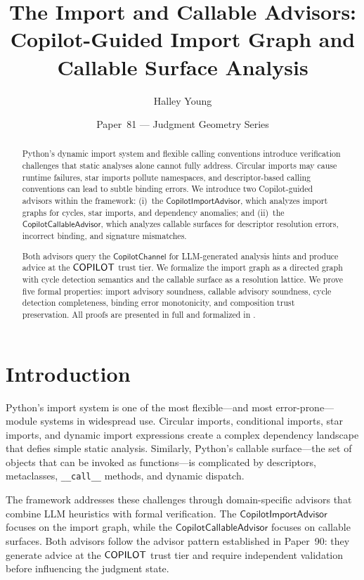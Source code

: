 \documentclass[11pt]{article}
\title{\textbf{The Import and Callable Advisors:\\
Copilot-Guided Import Graph and Callable Surface Analysis}}
\author{Halley Young}
\date{Paper~81 --- Judgment Geometry Series}
\newcommand{\ImportAdv}{\mathsf{CopilotImportAdvisor}}
\newcommand{\CallAdv}{\mathsf{CopilotCallableAdvisor}}
\newcommand{\CopChan}{\mathsf{CopilotChannel}}
\begin{document}
\maketitle

\begin{abstract}
Python's dynamic import system and flexible calling conventions
introduce verification challenges that static analyses alone
cannot fully address.  Circular imports may cause runtime failures,
star imports pollute namespaces, and descriptor-based calling
conventions can lead to subtle binding errors.  We introduce two
Copilot-guided advisors within the \JuGeo{} framework:
(i)~the $\ImportAdv$, which analyzes import graphs for cycles,
star imports, and dependency anomalies; and
(ii)~the $\CallAdv$, which analyzes callable surfaces for
descriptor resolution errors, incorrect binding, and signature
mismatches.

Both advisors query the $\CopChan$ for LLM-generated analysis
hints and produce advice at the $\mathsf{COPILOT}$ trust tier.  We
formalize the import graph as a directed graph with cycle detection
semantics and the callable surface as a resolution lattice.  We
prove five formal properties: import advisory soundness, callable
advisory soundness, cycle detection completeness, binding error
monotonicity, and composition trust preservation.  All proofs are
presented in full and formalized in \LEAN.
\end{abstract}

\section{Introduction}
\label{sec:intro}

Python's import system is one of the most flexible---and most
error-prone---module systems in widespread use.  Circular imports,
conditional imports, star imports, and dynamic import expressions
create a complex dependency landscape that defies simple static
analysis.  Similarly, Python's callable surface---the set of
objects that can be invoked as functions---is complicated by
descriptors, metaclasses, \texttt{\_\_call\_\_} methods, and
dynamic dispatch.

The \JuGeo{} framework addresses these challenges through
domain-specific advisors that combine LLM heuristics with formal
verification.  The $\ImportAdv$ focuses on the import graph,
while the $\CallAdv$ focuses on callable surfaces.  Both advisors
follow the advisor pattern established in Paper~90: they generate
advice at the $\mathsf{COPILOT}$ trust tier and require independent
validation before influencing the judgment state.
\end{document}
